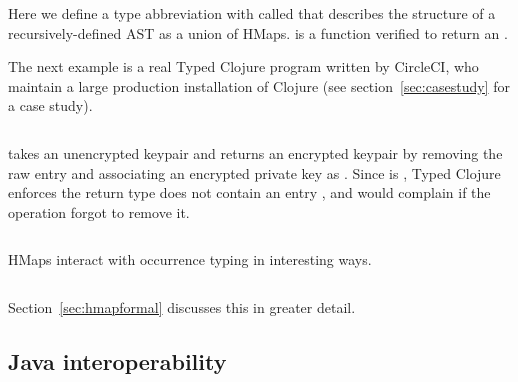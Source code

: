 \begin{Code}
\begin{exmp}
\inputminted[firstline=6,lastline=13]{clojure}{code/demo/src/demo/hmap.clj}
\label{example:decleaf}
\end{exmp}
\end{Code}

Here we define a type abbreviation with  called 
that describes the structure of a recursively-defined AST as a union of HMaps.
 is a function verified to return an .

The next example is a real Typed Clojure program written by CircleCI, who maintain a large production
installation of Clojure (see section~\ref{sec:casestudy} for a case study).

\begin{Code}
\begin{exmp}
\inputminted[firstline=10,lastline=22]{clojure}{code/demo/src/demo/key.clj}
\end{exmp}
\end{Code}

 takes an unencrypted keypair and returns an encrypted keypair by
removing the raw  entry and associating an encrypted private key
as .
Since  is , Typed Clojure enforces the return type
does not contain an entry , and would complain if the 
operation forgot to remove it.

\begin{Code}
\begin{exmp}
\inputminted[firstline=10,lastline=23]{clojure}{code/demo/src/demo/key2.clj}
\end{exmp}
\end{Code}


HMaps interact with occurrence typing in interesting ways.

\begin{Code}
\begin{exmp}
\inputminted[firstline=15,lastline=27]{clojure}{code/demo/src/demo/hmap.clj}
\end{exmp}
\end{Code}

Section~\ref{sec:hmapformal} discusses this in greater detail.

\subsection{Java interoperability}
\label{sec:overviewjavainterop}

